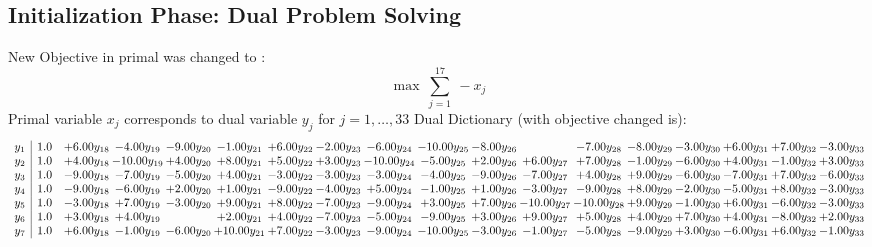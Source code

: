 \documentclass[9pt]{article}
\begin{document}
\subsection{Initialization Phase: Dual Problem Solving}
New Objective in primal was changed to : \[ \max\ \sum_{j=1}^{17}\ - x_j \] 
Primal variable $x_j$ corresponds to dual variable $y_j$ for $j = 1,\ldots,33$
Dual Dictionary (with objective changed is): 
\[\begin{array}{c| c c@{\hskip 2pt} c@{\hskip 2pt} c@{\hskip 2pt} c@{\hskip 2pt} c@{\hskip 2pt} c@{\hskip 2pt} c@{\hskip 2pt} c@{\hskip 2pt} c@{\hskip 2pt} c@{\hskip 2pt} c@{\hskip 2pt} c@{\hskip 2pt} c@{\hskip 2pt} c@{\hskip 2pt} c@{\hskip 2pt} c@{\hskip 2pt} }
 y_{1}   &  1.0 & +  6.00 y_{18} & -4.00 y_{19} & -9.00 y_{20} & -1.00 y_{21} & +  6.00 y_{22} & -2.00 y_{23} & -6.00 y_{24} & -10.00 y_{25} & -8.00 y_{26} &   & -7.00 y_{28} & -8.00 y_{29} & -3.00 y_{30} & +  6.00 y_{31} & +  7.00 y_{32} & -3.00 y_{33}\\
 y_{2}   &  1.0 & +  4.00 y_{18} & -10.00 y_{19} & +  4.00 y_{20} & +  8.00 y_{21} & +  5.00 y_{22} & +  3.00 y_{23} & -10.00 y_{24} & -5.00 y_{25} & +  2.00 y_{26} & +  6.00 y_{27} & +  7.00 y_{28} & -1.00 y_{29} & -6.00 y_{30} & +  4.00 y_{31} & -1.00 y_{32} & +  3.00 y_{33}\\
 y_{3}   &  1.0 & -9.00 y_{18} & -7.00 y_{19} & -5.00 y_{20} & +  4.00 y_{21} & -3.00 y_{22} & -3.00 y_{23} & -3.00 y_{24} & -4.00 y_{25} & -9.00 y_{26} & -7.00 y_{27} & +  4.00 y_{28} & +  9.00 y_{29} & -6.00 y_{30} & -7.00 y_{31} & +  7.00 y_{32} & -6.00 y_{33}\\
 y_{4}   &  1.0 & -9.00 y_{18} & -6.00 y_{19} & +  2.00 y_{20} & +  1.00 y_{21} & -9.00 y_{22} & -4.00 y_{23} & +  5.00 y_{24} & -1.00 y_{25} & +  1.00 y_{26} & -3.00 y_{27} & -9.00 y_{28} & +  8.00 y_{29} & -2.00 y_{30} & -5.00 y_{31} & +  8.00 y_{32} & -3.00 y_{33}\\
 y_{5}   &  1.0 & -3.00 y_{18} & +  7.00 y_{19} & -3.00 y_{20} & +  9.00 y_{21} & +  8.00 y_{22} & -7.00 y_{23} & -9.00 y_{24} & +  3.00 y_{25} & +  7.00 y_{26} & -10.00 y_{27} & -10.00 y_{28} & +  9.00 y_{29} & -1.00 y_{30} & +  6.00 y_{31} & -6.00 y_{32} & -3.00 y_{33}\\
 y_{6}   &  1.0 & +  3.00 y_{18} & +  4.00 y_{19} &   & +  2.00 y_{21} & +  4.00 y_{22} & -7.00 y_{23} & -5.00 y_{24} & -9.00 y_{25} & +  3.00 y_{26} & +  9.00 y_{27} & +  5.00 y_{28} & +  4.00 y_{29} & +  7.00 y_{30} & +  4.00 y_{31} & -8.00 y_{32} & +  2.00 y_{33}\\
 y_{7}   &  1.0 & +  6.00 y_{18} & -1.00 y_{19} & -6.00 y_{20} & + 10.00 y_{21} & +  7.00 y_{22} & -3.00 y_{23} & -9.00 y_{24} & -10.00 y_{25} & -3.00 y_{26} & -1.00 y_{27} & -5.00 y_{28} & -9.00 y_{29} & +  3.00 y_{30} & -6.00 y_{31} & +  6.00 y_{32} & -1.00 y_{33}\\

\end{array}\]
\end{document}
